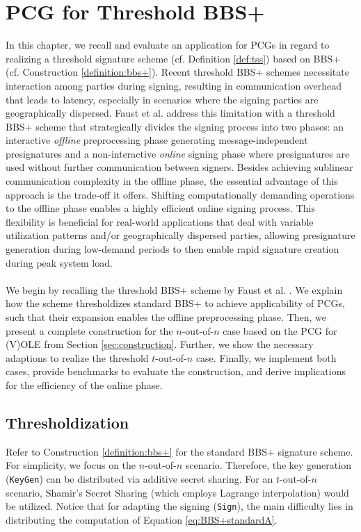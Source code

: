 \chapter{PCG for Threshold BBS+}
\label{chapter:PCGforBBSPlus}
In this chapter, we recall and evaluate an application for PCGs in regard to realizing a threshold signature scheme (cf. Definition \ref{def:tss}) based on BBS+ (cf. Construction \ref{definition:bbs+}). Recent threshold BBS+ schemes \cite{gennaro2019fully, doerner2023threshold} necessitate interaction among parties during signing, resulting in communication overhead that leads to latency, especially in scenarios where the signing parties are geographically dispersed. Faust et al. \cite{faust2023non} address this limitation with a threshold BBS+ scheme that strategically divides the signing process into two phases: an interactive \textit{offline} preprocessing phase generating message-independent presignatures and a non-interactive \textit{online} signing phase where presignatures are used without further communication between signers. Besides achieving sublinear communication complexity in the offline phase, the essential advantage of this approach is the trade-off it offers. Shifting computationally demanding operations to the offline phase enables a highly efficient online signing process. This flexibility is beneficial for real-world applications that deal with variable utilization patterns and/or geographically dispersed parties, allowing presignature generation during low-demand periods to then enable rapid signature creation during peak system load. 
\\\\
We begin by recalling the threshold BBS+ scheme by Faust et al. \cite{faust2023non}. We explain how the scheme thresholdizes standard BBS+ to achieve applicability of PCGs, such that their expansion enables the offline preprocessing phase. Then, we present a complete construction for the $n$-out-of-$n$ case based on the PCG for (V)OLE from Section \ref{sec:construction}. Further, we show the necessary adaptions to realize the threshold $t$-out-of-$n$ case. Finally, we implement both cases, provide benchmarks to evaluate the construction, and derive implications for the efficiency of the online phase. 

\section{Thresholdization}
Refer to Construction \ref{definition:bbs+} for the standard BBS+ signature scheme. For simplicity, we focus on the $n$-out-of-$n$ scenario. Therefore, the key generation (\texttt{\textup{KeyGen}}) can be distributed via additive secret sharing. For an $t$-out-of-$n$ scenario, Shamir's Secret Sharing  \cite{shamir1979share} (which employs Lagrange interpolation) would be utilized. Notice that for adapting the signing (\texttt{\textup{Sign}}), the main difficulty lies in distributing the computation of Equation \ref{eq:BBS+standardA}.

